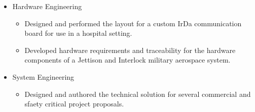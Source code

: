 \documentclass[print]{template/friggeri-cv} %
\begin{document}
\begin{entrylist}
{\begin{itemize}
\begin{itemize}
\item Developed and ran robustness testing software for a Jettison and Interlock military aerospace system.
\item Created drivers and board support package for several custom aviation computer architectures based on the VxWorks and VxWorks 653 operating system.  Drivers included DMA, VME, PCI, SPI, Ethernet, RS-232/422/485, and HDLC.
\item Ported several VxWorks board support packages to an equivalent VxWorks 653 board support packages.
\item Developed the software for a custom DSP board, which was used to verify the operation of the National Instrument test harness.  The software was developed separately from the production software to meet DO-178B’s independence criteria.
\item Developed a test application to verify the functionality of a TCP/IP stack to relevant Request For Comments (RFCs).
\end{itemize}
\item Hardware Engineering
\begin{itemize}
\item Designed and performed the layout for a custom IrDa communication board for use in a hospital setting.
\item Developed hardware requirements and traceability for the hardware components of a Jettison and Interlock military aerospace system.
\end{itemize}
\item System Engineering
\begin{itemize}
\item Designed and authored the technical solution for several commercial and sfaety critical project proposals.
\end{itemize}
\end{itemize}}


\end{entrylist}
\end{document}
